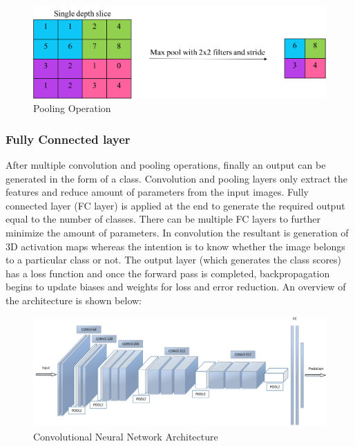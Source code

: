 \documentclass[11pt]{article}
\begin{document}
\begin{figure}[H]
	\includegraphics[width=\linewidth]{files/cnn_architecture/pooling.png}
	\caption{Pooling Operation}
	\label{fig:Pooling Operation}
\end{figure}


\subsubsection{Fully Connected layer}
After multiple convolution and pooling operations, finally an output can be generated in the form of a class. Convolution and pooling layers only extract the features and reduce amount of parameters from the input images. Fully connected layer (FC layer) is applied at the end to generate the required output equal to the number of classes. There can be multiple FC layers to further minimize the amount of parameters. In convolution the resultant is generation of 3D activation maps whereas the intention is to know whether the image belongs to a particular class or not. The output layer (which generates the class scores) has a loss function and once the forward pass is completed, backpropagation begins to update biases and weights for loss and error reduction. An overview of the architecture is shown below:

\begin{figure}[H]
	\centering
	\includegraphics[width=\linewidth]{files/cnn_architecture/arch.png}
	\caption{Convolutional Neural Network Architecture \cite{2016face}}
	\label{fig: CNN architecture}
\end{figure}
\end{document}
